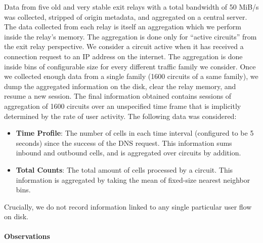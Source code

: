 Data from five old and very stable exit relays with a total bandwidth of 50
MiB/s was collected, stripped of origin metadata, and aggregated on a central
server. The data collected from each relay is itself an aggregation which we
perform inside the relay's memory. The aggregation is done only for ``active
circuits'' from the exit relay perspective. We consider a circuit active when it
has received a connection request to an IP address on the internet.
The aggregation is done inside bins of configurable size for every different
traffic family we consider. Once we collected enough data from a single family
(1600 circuits of a same family), we dump the aggregated information on the
disk, clear the relay memory, and resume a new session. The final information
obtained contains sessions of aggregation of 1600 circuits over an unspecified
time frame that is implicitly determined by the rate of user activity. The
following data was considered:

\begin{itemize}
\item \textbf{Time Profile}: The number of cells in each time interval
  (configured to be 5 seconds) since the success of the DNS request. This
  information sums inbound and outbound cells, and is aggregated over circuits
  by addition.
\item \textbf{Total Counts}: The total amount of cells processed by a circuit.
  This information is aggregated by taking the mean of fixed-size nearest
  neighbor bins.
\end{itemize}

Crucially, we do not record information linked to any single particular user
flow on disk.

\paragraph*{Observations}

